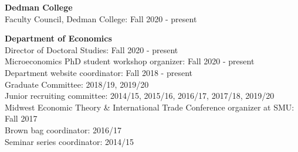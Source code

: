 \documentclass[11pt]{res}
\begin{document}
\begin{resume}
\textbf{Dedman College}\vspace{1.5mm}\\
Faculty Council, Dedman College: Fall 2020 - present

\textbf{Department of Economics}\vspace{1.5mm}\\
Director of Doctoral Studies: Fall 2020 - present\vspace{1.5mm}\\
Microeconomics PhD student workshop organizer: Fall 2020 - present\vspace{1.5mm}\\
Department website coordinator: Fall 2018 - present\vspace{1.5mm}\\
Graduate Committee: 2018/19, 2019/20\vspace{1.5mm}\\
Junior recruiting committee: 2014/15, 2015/16, 2016/17, 2017/18, 2019/20\vspace{1.5mm}\\
Midwest Economic Theory \& International Trade Conference organizer at SMU: Fall 2017\vspace{1.5mm}\\
Brown bag coordinator: 2016/17\vspace{1.5mm}\\
Seminar series coordinator: 2014/15

\end{resume}
\end{document}
